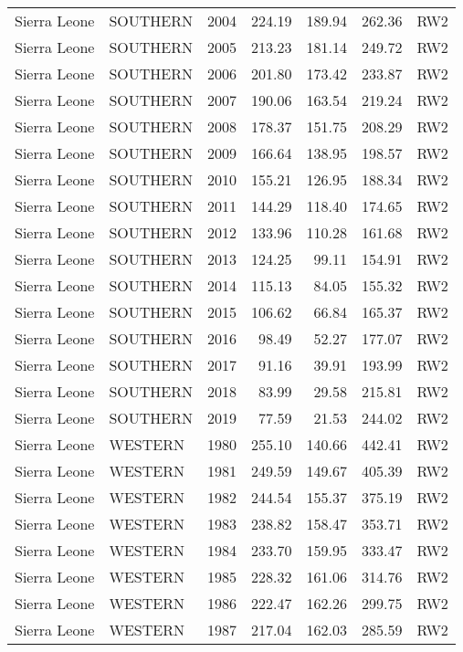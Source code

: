 \begin{longtable}{lllrrrl}
  Sierra Leone & SOUTHERN & 2004 & 224.19 & 189.94 & 262.36 & RW2 \\ 
  Sierra Leone & SOUTHERN & 2005 & 213.23 & 181.14 & 249.72 & RW2 \\ 
  Sierra Leone & SOUTHERN & 2006 & 201.80 & 173.42 & 233.87 & RW2 \\ 
  Sierra Leone & SOUTHERN & 2007 & 190.06 & 163.54 & 219.24 & RW2 \\ 
  Sierra Leone & SOUTHERN & 2008 & 178.37 & 151.75 & 208.29 & RW2 \\ 
  Sierra Leone & SOUTHERN & 2009 & 166.64 & 138.95 & 198.57 & RW2 \\ 
  Sierra Leone & SOUTHERN & 2010 & 155.21 & 126.95 & 188.34 & RW2 \\ 
  Sierra Leone & SOUTHERN & 2011 & 144.29 & 118.40 & 174.65 & RW2 \\ 
  Sierra Leone & SOUTHERN & 2012 & 133.96 & 110.28 & 161.68 & RW2 \\ 
  Sierra Leone & SOUTHERN & 2013 & 124.25 & 99.11 & 154.91 & RW2 \\ 
  Sierra Leone & SOUTHERN & 2014 & 115.13 & 84.05 & 155.32 & RW2 \\ 
  Sierra Leone & SOUTHERN & 2015 & 106.62 & 66.84 & 165.37 & RW2 \\ 
  Sierra Leone & SOUTHERN & 2016 & 98.49 & 52.27 & 177.07 & RW2 \\ 
  Sierra Leone & SOUTHERN & 2017 & 91.16 & 39.91 & 193.99 & RW2 \\ 
  Sierra Leone & SOUTHERN & 2018 & 83.99 & 29.58 & 215.81 & RW2 \\ 
  Sierra Leone & SOUTHERN & 2019 & 77.59 & 21.53 & 244.02 & RW2 \\ 
  Sierra Leone & WESTERN & 1980 & 255.10 & 140.66 & 442.41 & RW2 \\ 
  Sierra Leone & WESTERN & 1981 & 249.59 & 149.67 & 405.39 & RW2 \\ 
  Sierra Leone & WESTERN & 1982 & 244.54 & 155.37 & 375.19 & RW2 \\ 
  Sierra Leone & WESTERN & 1983 & 238.82 & 158.47 & 353.71 & RW2 \\ 
  Sierra Leone & WESTERN & 1984 & 233.70 & 159.95 & 333.47 & RW2 \\ 
  Sierra Leone & WESTERN & 1985 & 228.32 & 161.06 & 314.76 & RW2 \\ 
  Sierra Leone & WESTERN & 1986 & 222.47 & 162.26 & 299.75 & RW2 \\ 
  Sierra Leone & WESTERN & 1987 & 217.04 & 162.03 & 285.59 & RW2 \\ 

\end{longtable}
